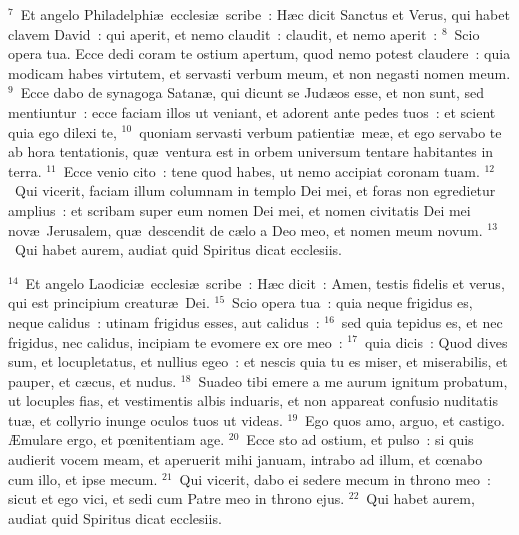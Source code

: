 ${}^{7}$~Et angelo Philadelphi\ae\ ecclesi\ae\ scribe~: H\ae c dicit Sanctus et Verus, qui habet clavem David~: qui aperit, et nemo claudit~: claudit, et nemo aperit~:
${}^{8}$~Scio opera tua. Ecce dedi coram te ostium apertum, quod nemo potest claudere~: quia modicam habes virtutem, et servasti verbum meum, et non negasti nomen meum.
${}^{9}$~Ecce dabo de synagoga Satan\ae , qui dicunt se Jud\ae os esse, et non sunt, sed mentiuntur~: ecce faciam illos ut veniant, et adorent ante pedes tuos~: et scient quia ego dilexi te,
${}^{10}$~quoniam servasti verbum patienti\ae\ me\ae , et ego servabo te ab hora tentationis, qu\ae\ ventura est in orbem universum tentare habitantes in terra.
${}^{11}$~Ecce venio cito~: tene quod habes, ut nemo accipiat coronam tuam.
${}^{12}$~Qui vicerit, faciam illum columnam in templo Dei mei, et foras non egredietur amplius~: et scribam super eum nomen Dei mei, et nomen civitatis Dei mei nov\ae\ Jerusalem, qu\ae\ descendit de c\ae lo a Deo meo, et nomen meum novum.
${}^{13}$~Qui habet aurem, audiat quid Spiritus dicat ecclesiis.


${}^{14}$~Et angelo Laodici\ae\ ecclesi\ae\ scribe~: H\ae c dicit~: Amen, testis fidelis et verus, qui est principium creatur\ae\ Dei.
${}^{15}$~Scio opera tua~: quia neque frigidus es, neque calidus~: utinam frigidus esses, aut calidus~:
${}^{16}$~sed quia tepidus es, et nec frigidus, nec calidus, incipiam te evomere ex ore meo~:
${}^{17}$~quia dicis~: Quod dives sum, et locupletatus, et nullius egeo~: et nescis quia tu es miser, et miserabilis, et pauper, et c\ae cus, et nudus.
${}^{18}$~Suadeo tibi emere a me aurum ignitum probatum, ut locuples fias, et vestimentis albis induaris, et non appareat confusio nuditatis tu\ae , et collyrio inunge oculos tuos ut videas.
${}^{19}$~Ego quos amo, arguo, et castigo. \AE mulare ergo, et pœnitentiam age.
${}^{20}$~Ecce sto ad ostium, et pulso~: si quis audierit vocem meam, et aperuerit mihi januam, intrabo ad illum, et cœnabo cum illo, et ipse mecum.
${}^{21}$~Qui vicerit, dabo ei sedere mecum in throno meo~: sicut et ego vici, et sedi cum Patre meo in throno ejus.
${}^{22}$~Qui habet aurem, audiat quid Spiritus dicat ecclesiis.

